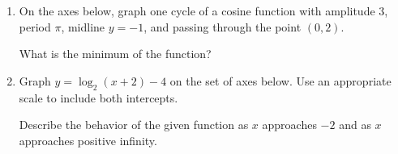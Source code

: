 \documentclass[12pt, oneside]{article}
\begin{document}
\begin{enumerate}
\newpage
\item On the axes below, graph one cycle of a cosine function with amplitude 3, period $\pi$, midline $y=-1$, and passing through the point $(0,2)$.
\begin{center}
\end{center} %
What is the minimum of the function?

\newpage

\item Graph $y= \log_2(x+2)-4$ on the set of axes below. Use an appropriate scale to include both intercepts.
\begin{center}
\end{center}

Describe the behavior of the given function as $x$ approaches $-2$ and as $x$ approaches positive infinity. %


\end{enumerate}
\end{document}
